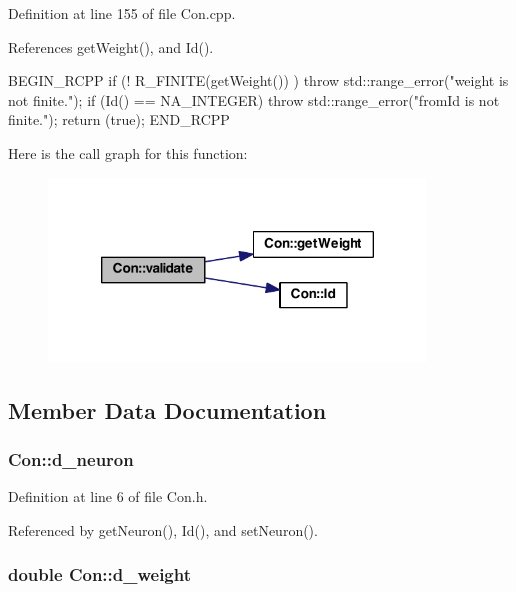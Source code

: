 Definition at line 155 of file Con.cpp.



References getWeight(), and Id().


\begin{DoxyCode}
{
  BEGIN_RCPP
  if (! R_FINITE(getWeight()) ) throw std::range_error("weight is not finite.");
  if (Id() == NA_INTEGER)
    throw std::range_error("fromId is not finite.");
  return (true);
END_RCPP}
\end{DoxyCode}


Here is the call graph for this function:\nopagebreak
\begin{figure}[H]
\begin{center}
\leavevmode
\includegraphics[width=284pt]{class_con_af5f836a7b0988b3d9113589b2959d5e6_cgraph}
\end{center}
\end{figure}




\subsection{Member Data Documentation}
\hypertarget{class_con_aad857bd289343ecff2153acc852f34f0}{
\subsubsection[{d\_\-neuron}]{ {\bf Con::d\_\-neuron}}}
\label{class_con_aad857bd289343ecff2153acc852f34f0}


Definition at line 6 of file Con.h.



Referenced by getNeuron(), Id(), and setNeuron().

\hypertarget{class_con_a41e043e0dfb126f3bdacbbd8caf33672}{
\subsubsection[{d\_\-weight}]{\setlength{\rightskip}{0pt plus 5cm}double {\bf Con::d\_\-weight}}}
\label{class_con_a41e043e0dfb126f3bdacbbd8caf33672}


